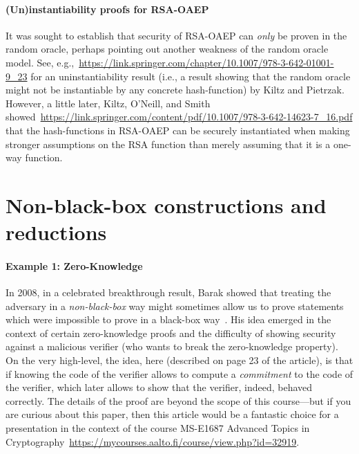 \documentclass[a4paper,table,dvipsnames]{article}
\theoremstyle{definition}
\begin{document}
\paragraph{(Un)instantiability proofs for RSA-OAEP}
It was sought to establish that security of RSA-OAEP can \emph{only} be proven in the random oracle,
perhaps pointing out another weakness of the random oracle model. See, e.g.,~\url{https://link.springer.com/chapter/10.1007/978-3-642-01001-9_23}
for an uninstantiability result (i.e., a result showing that the random oracle might not be instantiable
by any concrete hash-function) by Kiltz and Pietrzak. However, a little later, Kiltz, O’Neill, and Smith
showed~\url{https://link.springer.com/content/pdf/10.1007/978-3-642-14623-7_16.pdf} that the hash-functions in RSA-OAEP can be securely instantiated
when making stronger assumptions on the RSA function than merely assuming that it is a one-way function.



\section{Non-black-box constructions and reductions}\label{sec:nonbb}
\paragraph{Example 1: Zero-Knowledge} In 2008, in a celebrated breakthrough result, Barak showed that treating the adversary in
a \emph{non-black-box} way might sometimes allow us to prove statements which were impossible
to prove in a black-box way~\cite{https://www.boazbarak.org/Papers/nonbb.pdf}. His idea emerged
in the context of certain zero-knowledge proofs and the difficulty of showing security against a malicious
verifier (who wants to break the zero-knowledge property). On the very high-level, the idea, here (described on page 23 of 
the article), is that if knowing the code of the verifier allows to compute a \emph{commitment} to
the code of the verifier, which later allows to show that the verifier, indeed, behaved correctly.
The details of the proof are beyond the scope of this course---but if you are curious about this
paper, then this article would be a fantastic choice for a presentation in the context of the course
MS-E1687 Advanced Topics in Cryptography~\url{https://mycourses.aalto.fi/course/view.php?id=32919}.
\end{document}
